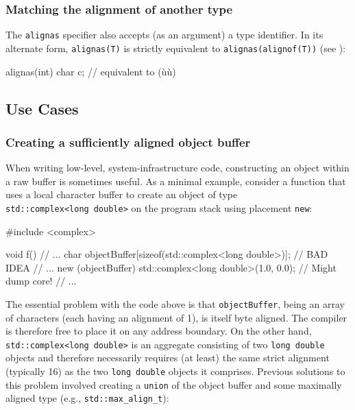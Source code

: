     

\subsubsection[Matching the alignment of another type]{Matching the alignment of another type}\label{matching-the-alignment-of-another-type}

The \lstinline!alignas! specifier also accepts (as an argument) a type
identifier. In its alternate form, \lstinline!alignas(T)! is strictly
equivalent to \lstinline!alignas(alignof(T))! (see ):

\begin{emcppslisting}
alignas(int) char c;  // equivalent to (ù{}ù)
\end{emcppslisting}
    

\subsection[Use Cases]{Use Cases}\label{alignas-use-cases}

\subsubsection[Creating a sufficiently aligned object buffer]{Creating a sufficiently aligned object buffer}\label{creating-a-sufficiently-aligned-object-buffer}

When writing low-level, system-infrastructure code, constructing an object within a raw buffer is sometimes useful. As a minimal
example, consider a function that uses a local character buffer to
create an object of type \lstinline!std::complex<long!~\lstinline!double>! on
the program stack using placement \lstinline!new!:

\begin{emcppslisting}
#include <complex>

void f()
{
    // ...
    char objectBuffer[sizeof(std::complex<long double>)];  // BAD IDEA
    // ...
    new (objectBuffer) std::complex<long double>(1.0, 0.0);  // Might dump core!
    // ...
}
\end{emcppslisting}
    
\noindent The essential problem with the code above is that \lstinline!objectBuffer!,
being an array of characters (each having an alignment of 1), is itself
byte aligned. The compiler is therefore free to place it on any address
boundary. On the other hand, \lstinline!std::complex<long!~\lstinline!double>! is an aggregate consisting of two \lstinline!long!~\lstinline!double! objects
and therefore necessarily requires (at least) the same strict alignment
(typically 16) as the two \lstinline!long!~\lstinline!double! objects it comprises. Previous
solutions to this problem involved creating a \lstinline!union! of the
object buffer and some maximally aligned type (e.g.,
\lstinline!std::max_align_t!):

